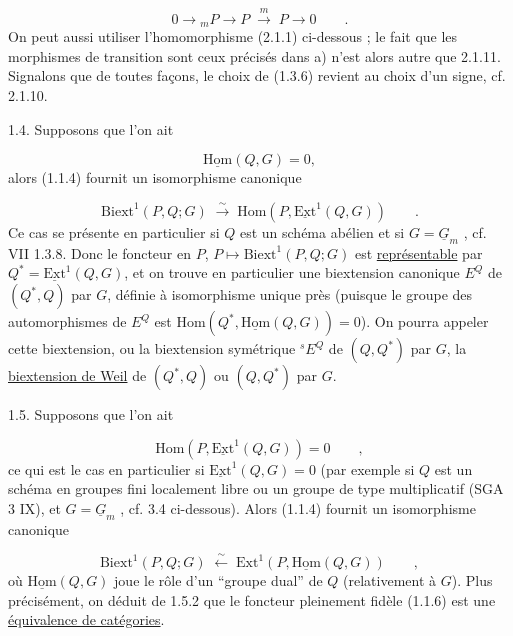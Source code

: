 \begin{equation*}
0 \longrightarrow {}_mP \longrightarrow P \;\stackrel{m}{\longrightarrow}\; P \longrightarrow 0 \qquad .
\end{equation*}
On peut aussi utiliser l'homomorphisme (2.1.1) ci-dessous ; le fait que les morphismes de transition sont ceux précisés dans a) n'est alors autre que 2.1.11. Signalons que de toutes façons, le choix de (1.3.6) revient au choix d'un signe, cf. 2.1.10.

1.4.  Supposons que l'on ait

\begin{equation}\tag{1.4.1}
\underline{\mathrm{Hom}}(Q,G) = 0,
\end{equation}
alors (1.1.4) fournit un isomorphisme canonique

\begin{equation}\tag{1.4.2}
\mathrm{Biext}^1(P,Q;G) \;\stackrel{\sim}{\longrightarrow}\; \mathrm{Hom}(P, \underline{\mathrm{Ext}}^1(Q,G)) \qquad .
\end{equation}
Ce cas se présente en particulier si $Q$ est un schéma abélien et si $G = \underline{G}_m$ , cf. VII 1.3.8. Donc le foncteur en $P$, $P \longmapsto \mathrm{Biext}^1(P,Q;G)$ est \underline{représentable} par $Q^* = \underline{\mathrm{Ext}}^1(Q,G)$, et on trouve en particulier une biextension canonique $E^Q$ de $(Q^*,Q)$ par $G$, définie à isomorphisme unique près (puisque le groupe des automorphismes de $E^Q$ est $\mathrm{Hom}(Q^*,\underline{\mathrm{Hom}}(Q,G)) = 0$). On pourra appeler cette biextension, ou la biextension symétrique ${}^sE^Q$ de $(Q,Q^*)$ par $G$, la \underline{biextension de Weil} de $(Q^*,Q)$ ou $(Q,Q^*)$ par $G$.

1.5.  Supposons que l'on ait

\begin{equation}\tag{1.5.1}
\mathrm{Hom}(P, \underline{\mathrm{Ext}}^1(Q,G)) = 0 \qquad ,
\end{equation}
ce qui est le cas en particulier si $\underline{\mathrm{Ext}}^1(Q,G) = 0$ (par exemple si $Q$ est un schéma en groupes fini localement libre ou un groupe de type multiplicatif (SGA 3 IX), et $G = \underline{G}_m$ , cf. 3.4 ci-dessous). Alors (1.1.4) fournit un isomorphisme canonique

\begin{equation}\tag{1.5.2}
\mathrm{Biext}^1(P,Q; G) \;\stackrel{\sim}{\longleftarrow}\; \mathrm{Ext}^1(P,\underline{\mathrm{Hom}}(Q,G)) \qquad ,
\end{equation}
où $\underline{\mathrm{Hom}}(Q,G)$ joue le rôle d'un ``groupe dual'' de $Q$ (relativement à $G$). Plus précisément, on déduit de 1.5.2 que le foncteur pleinement fidèle (1.1.6) est une \underline{équivalence de catégories}.

